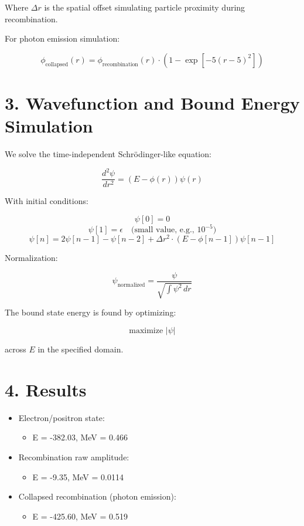 \documentclass[12pt]{article}
\begin{document}
	Where $\Delta r$ is the spatial offset simulating particle proximity during recombination.

For photon emission simulation:

\[
	\phi_{\text{collapsed}}(r) = \phi_{\text{recombination}}(r) \cdot \left(1 - \exp\left[-5(r - 5)^2\right]\right)
\]

\section*{3. Wavefunction and Bound Energy Simulation}
We solve the time-independent Schrödinger-like equation:

\[
	\frac{d^2 \psi}{dr^2} = \left( E - \phi(r) \right) \psi(r)
\]

With initial conditions:

\[
	\psi[0] = 0
\]
\[
	\psi[1] = \epsilon \quad \text{(small value, e.g., } 10^{-5} \text{)}
\]
\[
	\psi[n] = 2 \psi[n-1] - \psi[n-2] + \Delta r^2 \cdot \left( E - \phi[n-1] \right) \psi[n-1]
\]

Normalization:

\[
	\psi_{\text{normalized}} = \frac{\psi}{\sqrt{\int \psi^2 \, dr}}
\]

The bound state energy is found by optimizing:

\[
	\text{maximize } \left| \psi \right|
\]

across $E$ in the specified domain.


\section*{4. Results}
\begin{itemize}
  \item Electron/positron state:
    \begin{itemize}
      \item E = -382.03, MeV = 0.466
    \end{itemize}
  \item Recombination raw amplitude:
    \begin{itemize}
      \item E = -9.35, MeV = 0.0114
    \end{itemize}
  \item Collapsed recombination (photon emission):
    \begin{itemize}
      \item E = -425.60, MeV = 0.519
    \end{itemize}
\end{itemize}
\end{document}
